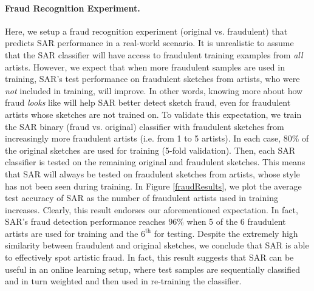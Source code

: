 \vspace{-2mm}
\paragraph{Fraud Recognition Experiment.} Here, we setup a fraud recognition experiment (original vs. fraudulent) that predicts SAR performance in a real-world scenario. It is unrealistic to assume that the SAR classifier will have access to fraudulent training examples from \emph{all} artists. However, we expect that when more fraudulent samples are used in training, SAR's test performance on fraudulent sketches from artists, who were \emph{not} included in training, will improve. In other words, knowing more about how fraud \emph{looks} like will help SAR better detect sketch fraud, even for fraudulent artists whose sketches are not trained on. To validate this expectation, we train the SAR binary (fraud vs. original) classifier with fraudulent sketches from increasingly more fraudulent artists (i.e. from 1 to 5 artists). In each case, 80\% of the original sketches are used for training (5-fold validation). Then, each SAR classifier is tested on the remaining original and fraudulent sketches. This means that SAR will always be tested on fraudulent sketches from artists, whose style has not been seen during training. In Figure \ref{fraudResults}, we plot the average test accuracy of SAR as the number of fraudulent artists used in training increases. Clearly, this result endorses our aforementioned expectation. In fact, SAR's fraud detection performance reaches 96\% when 5 of the 6 fraudulent artists are used for training and the $6^{\text{th}}$ for testing. Despite the extremely high similarity between fraudulent and original sketches, we conclude that SAR is able to effectively spot artistic fraud. In fact, this result suggests that SAR can be useful in an online learning setup, where test samples are sequentially classified and in turn weighted and then used in re-training the classifier. %




